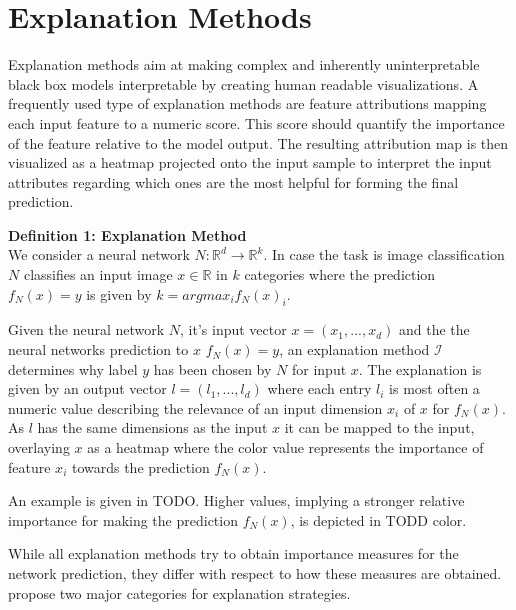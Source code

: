 \section{Explanation Methods}
\label{sec:explanation_methods}


Explanation methods aim at making complex and inherently uninterpretable black box models interpretable by creating human readable visualizations. 
A frequently used type of explanation methods are feature attributions mapping each input feature to a numeric score. This score should quantify the importance of the feature relative to the model output. The resulting attribution map is then visualized as a heatmap projected onto the input sample to interpret the input attributes regarding which ones are the most helpful for forming the final prediction. 

\textbf{Definition 1: Explanation Method}\\
We consider a neural network $N: \mathbb{R}^d \to \mathbb{R}^k$. In case the task is image classification $N$ classifies an input image $x\in  \mathbb{R}$ in $k$ categories where the prediction $f_N(x)=y$ is given by $k= arg max_i f_N(x)_i$.

Given the neural network $N$, it's input vector $x=(x_1, ..., x_d)$ and the the neural networks prediction to $x$ $f_N(x)=y$, an explanation method $\mathcal{I}$ determines why label $y$ has been chosen by $N$ for input $x$. The explanation is given by an output vector $l=(l_1, ..., l_d)$ where each entry $l_i$ is most often a numeric value describing the relevance of an input dimension $x_i$ of $x$ for $f_N(x)$. 
As $l$ has the same dimensions as the input $x$ it can be mapped to the input, overlaying $x$ as a heatmap where the color value represents the importance of feature $x_i$ towards the prediction $f_N(x)$.

An example is given in TODO. Higher values, implying a stronger relative importance for making the prediction $f_N(x)$, is depicted in TODD color. 



While all explanation methods try to obtain importance measures for the network prediction, they differ with respect to how these measures are obtained. 
\cite{evaluating_explanations_security} propose two major categories for explanation strategies.\\

